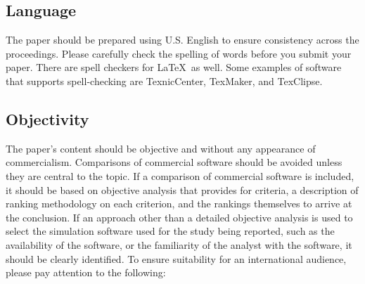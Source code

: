 \documentclass{article}
\begin{document}
\subsection{Language}

The paper should be prepared using U.S. English to ensure consistency across the proceedings. Please carefully check the spelling of words before you submit your paper. There are spell checkers for \LaTeX\ as well.
Some examples of software that supports spell-checking are TexnicCenter, TexMaker, and TexClipse.

\subsection{Objectivity}
The paper's content should be objective and without any appearance of commercialism.  Comparisons of commercial software should be avoided unless they are central to the topic.  If a comparison of commercial software is included, it should be based on objective analysis that provides for criteria, a description of ranking methodology on each criterion, and the rankings themselves to arrive at the conclusion.
If an approach other than a detailed objective analysis is used to select the simulation software used for the study being reported, such as the availability of the software, or the familiarity of the analyst with the software, it should be clearly identified. To ensure suitability for an international audience, please pay attention to the following:
\end{document}
